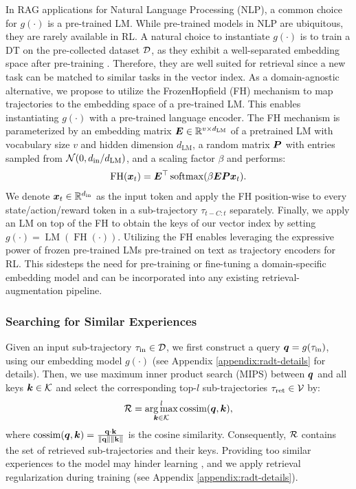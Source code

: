 \documentclass{article} %
\begin{document}
In RAG applications for Natural Language Processing (NLP), a common choice for $g(\cdot)$ is a pre-trained LM.
While pre-trained models in NLP are ubiquitous, they are rarely available in RL. 
A natural choice to instantiate $g(\cdot)$ is to train a DT on the pre-collected dataset $\mathcal{D}$, as they exhibit a well-separated embedding space after pre-training \citep{Schmied:23}.
Therefore, they are well suited for retrieval since a new task can be matched to similar tasks in the vector index.
As a domain-agnostic alternative, we propose to utilize the FrozenHopfield (FH) mechanism \citep{Paischer:22} to map trajectories to the embedding space of a pre-trained LM.
This enables instantiating $g(\cdot)$ with a pre-trained language encoder. 
The FH mechanism is parameterized by an embedding matrix $\bm{E} \in \mathbb{R}^{v\times d_{\text{LM}}}$ of a pretrained LM with vocabulary size $v$ and hidden dimension $d_{\text{LM}}$, a random matrix $\bm{P}$ with entries sampled from $\mathcal{N}(0, d_{\text{in}}/d_{\text{LM}})$, and a scaling factor $\beta$ and performs:
\begin{equation}\label{eq:frozenhopfield}
    \operatorname{FH}(\bm{x}_t) = \bm{E}^\top \operatorname{softmax}(\beta \bm{E} \bm{P}\bm{x}_t).
\end{equation}
We denote $\bm{x}_t \in \mathbb{R}^{d_{\text{in}}}$ as the input token and apply the FH position-wise to every state/action/reward token in a sub-trajectory $\tau_{t-C:t}$ separately.
Finally, we apply an LM on top of the FH to obtain the keys of our vector index by setting $g(\cdot) = \operatorname{LM}(\operatorname{FH}(\cdot))$.
Utilizing the FH enables leveraging the expressive power of frozen pre-trained LMs pre-trained on text as trajectory encoders for RL.
This sidesteps the need for pre-training or fine-tuning a domain-specific embedding model and can be incorporated into any existing retrieval-augmentation pipeline.

\subsubsection{Searching for Similar Experiences} 
Given an input sub-trajectory $\tau_{\text{in}} \in \mathcal{D}$, we first construct a query $\bm{q} = g(\tau_{\text{in}})$, using our embedding model $g(\cdot)$ (see Appendix \ref{appendix:radt-details} for details).
Then, we use maximum inner product search (MIPS) between $\bm{q}$ and all keys $\bm{k} \in \mathcal{K}$ and select the corresponding top-$l$ sub-trajectories $\tau_{\text{ret}} \in \mathcal{V}$ by:
\begin{equation}\label{eq:retrieve}
    \mathcal{R} = \operatorname*{arg\,max}^l_{\bm{k} \in \mathcal{K}} \operatorname{cossim} (\bm{q}, \bm{k}),
\end{equation}
where $\operatorname{cossim}(\bm{q}, \bm{k}) = \frac{\mathbf{q} \cdot \mathbf{k}}{\|\mathbf{q}\| \|\mathbf{k}\|}$ 
is the cosine similarity.
Consequently, $\mathcal{R}$ contains the set of retrieved sub-trajectories and their keys.
Providing too similar experiences to the model may hinder learning \citep{yasunaga_retrieval_2023}, and we apply retrieval regularization during training (see Appendix \ref{appendix:radt-details}). 
\end{document}
